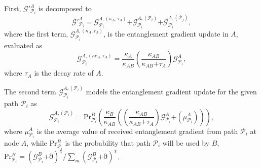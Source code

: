 \documentclass[11pt]{article}%
\begin{document}
 First, ${\mathcal{G}}'^A_{{\mathcal{P}}_i}$ is decomposed to
\begin{equation} \label{ZEqnNum919296} 
{\mathcal{G}}'^A_{{\mathcal{P}}_i}\mathrm{=}{\mathcal{G}}^{A,\left({\kappa }_A,{\tau }_A\right)}_{{\mathcal{P}}_i}\mathrm{+}{\mathcal{G}}^{A,\left({\mathcal{P}}_i\right)}_{{\mathcal{P}}_i}\mathrm{+}{\mathcal{G}}^{A,\left({\mathcal{P}}_j\right)}_{{\mathcal{P}}_i},                                                                
\end{equation} 
where the first term, ${\mathcal{G}}^{A,\left({\kappa }_A,{\tau }_A\right)}_{{\mathcal{P}}_i}$, is the entanglement gradient update in $A$, evaluated as
\begin{equation} \label{ZEqnNum311795} 
{\mathcal{G}}^{A,\left({\kappa{e}}_A,{\tau }_A\right)}_{{\mathcal{P}}_i}\mathrm{=}\frac{{\kappa }_A}{{\kappa }_{AB}}\left(\frac{{\kappa }_{AB}}{{\kappa }_{AB}\mathrm{+}{\tau }_A}\right){\mathcal{G}}^A_{{\mathcal{P}}_i},                                                                       
\end{equation} 
where ${\tau }_A$ is the decay rate of $A$.   

 The second term ${\mathcal{G}}^{A,\left({\mathcal{P}}_i\right)}_{{\mathcal{P}}_i}$ models the entanglement gradient update for the given path ${\mathcal{P}}_i$ as
\begin{equation} \label{ZEqnNum246466} 
{\mathcal{G}}^{A,\left({\mathcal{P}}_i\right)}_{{\mathcal{P}}_i}\mathrm{=P}{\mathrm{r}}^B_{{\mathcal{P}}_i}\left(\frac{{\kappa }_B}{{\kappa }_{AB}}\left(\left(\frac{{\kappa }_{AB}}{{\kappa }_{AB}\mathrm{+}{\tau }_A}\right){\mathcal{G}}^A_{{\mathcal{P}}_i}\mathrm{+}\left({\mu }^A_{{\mathcal{P}}_i}\right)\right)\right),                                                            
\end{equation} 
where ${\mu }^A_{{\mathcal{P}}_i}$ is the average value of received entanglement gradient from path ${\mathcal{P}}_i$ at node $A$, while $\mathrm{P}{\mathrm{r}}^B_{{\mathcal{P}}_i}$ is the probability that path ${\mathcal{P}}_i$ will be used by $B$, $\mathrm{P}{\mathrm{r}}^B_{{\mathcal{P}}_i}\mathrm{=}{{\left({\mathcal{G}}^B_{{\mathcal{P}}_i}\mathrm{+}\mathrm{\partial }\right)}^{\chi }}/{{\sum_m{\left({\mathcal{G}}^B_{{\mathcal{P}}_i}\mathrm{+}\mathrm{\partial }\right)}}^{\chi }}$.                                             
\end{document}
